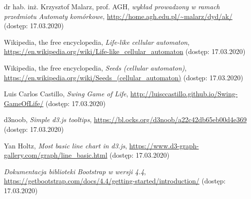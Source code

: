 \documentclass[12pt] {article}
\begin{document}
\begin{thebibliography}{9}

  dr hab. inż. Krzysztof Malarz, prof. AGH,
  \emph{wykład prowadzony w ramach przedmiotu Automaty komórkowe},
  \url{http://home.agh.edu.pl/~malarz/dyd/ak/} (dostęp: 17.03.2020)

  Wikipedia, the free encyclopedia,
  \emph{Life-like cellular automaton},
  \url{https://en.wikipedia.org/wiki/Life-like_cellular_automaton} (dostęp: 17.03.2020)

  Wikipedia, the free encyclopedia,
  \emph{Seeds (cellular automaton)},
  \url{https://en.wikipedia.org/wiki/Seeds_(cellular_automaton)} (dostęp: 17.03.2020)

  Luis Carlos Castillo,
  \emph{Swing Game of Life},
  \url{http://luisccastillo.github.io/Swing-GameOfLife/} (dostęp: 17.03.2020)

  d3noob,
  \emph{Simple d3.js tooltips},
  \url{https://bl.ocks.org/d3noob/a22c42db65eb00d4e369} (dostęp: 17.03.2020)

  Yan Holtz,
  \emph{Most basic line chart in d3.js},
  \url{https://www.d3-graph-gallery.com/graph/line_basic.html} (dostęp: 17.03.2020)

  \emph{Dokumentacja biblioteki Bootstrap w wersji 4.4},
  \url{https://getbootstrap.com/docs/4.4/getting-started/introduction/} (dostęp: 17.03.2020)

\end{thebibliography}
\end{document}
